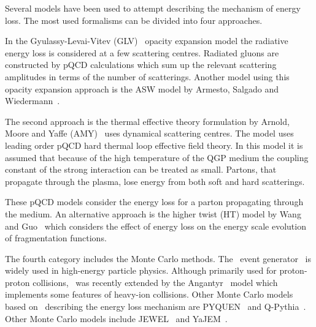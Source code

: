 Several models have been used to attempt describing the mechanism of energy loss. The most used formalisms can be divided into four approaches.
%

In the Gyulassy-Levai-Vitev (GLV)~\cite{Gyulassy:1999zd} opacity expansion model the radiative energy loss is considered at a few scattering centres. Radiated gluons are constructed by pQCD calculations which sum up the relevant scattering amplitudes in terms of the number of scatterings. Another model using this opacity expansion approach is the ASW model by Armesto, Salgado and Wiedermann~\cite{Wiedemann:2000za}.

The second approach is the thermal effective theory formulation by Arnold, Moore and Yaffe (AMY)~\cite{Arnold:2001ms} uses dynamical scattering centres. The model uses leading order pQCD hard thermal loop effective field theory. In this model it is assumed that because of the high temperature of the QGP medium the coupling constant of the strong interaction can be treated as small. Partons, that propagate through the plasma, lose energy from both soft and hard scatterings.

These pQCD models consider the energy loss for a parton propagating through the medium. An alternative approach is the higher twist (HT) model by Wang and Guo~\cite{Wang:2001ifa} which considers the effect of energy loss on the energy scale evolution of fragmentation functions.

The fourth category includes the Monte Carlo methods. The \pythia~event generator~\cite{pythia} is widely used in high-energy particle physics. Although primarily used for proton-proton collisions, \pythia~was recently extended by the Angantyr~\cite{Bierlich:2018xfw} model which implements some features of heavy-ion collisions. Other Monte Carlo models based on \pythia~describing the energy loss mechanism are PYQUEN~\cite{Lokhtin:2005px} and Q-Pythia~\cite{Armesto:2009zc}. Other Monte Carlo models include JEWEL~\cite{Zapp:2008gi} and YaJEM~\cite{Renk:2009nz}. 





